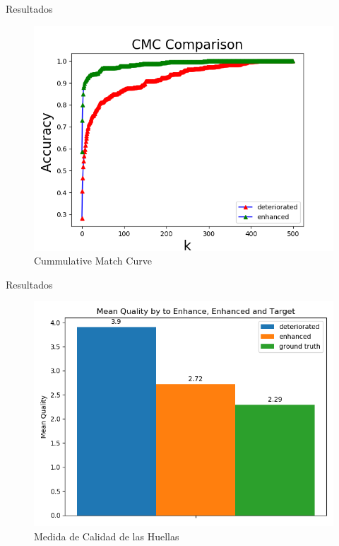 \documentclass[12pt,aspectratio=169]{beamer}
\begin{document}
\begin{frame}{Resultados}

    \begin{figure}[h]
        \includegraphics[scale=0.56]{figs/cmc_comparison.png}
        \caption{Cummulative Match Curve}
    \end{figure}
    
\end{frame}

\begin{frame}{Resultados}

    \begin{figure}[h]
        \includegraphics[scale=0.56]{figs/mean_qualities.png}
        \caption{Medida de Calidad de las Huellas}
    \end{figure}
    
\end{frame}
\end{document}
